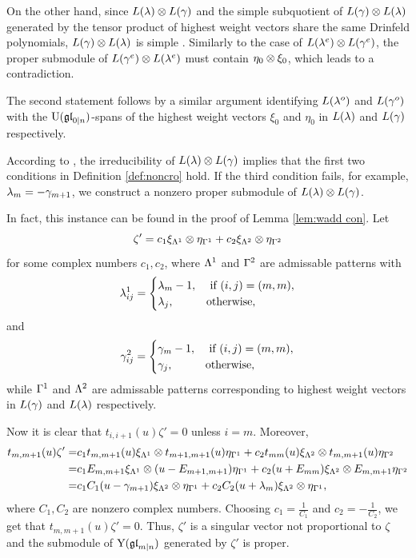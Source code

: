 \documentclass[12pt]{amsart}
\begin{document}
On the other hand, since $L(\lambda)\otimes L(\gamma)$ and the simple subquotient of $L(\gamma)\otimes L(\lambda)$ generated by the tensor product of highest weight vectors share the same Drinfeld polynomials, $L(\gamma)\otimes L(\lambda)$ is simple \cite{Zhang 1996}. Similarly to the case of $L(\lambda^e)\otimes L(\gamma^e)$, the proper submodule of $L(\gamma^e)\otimes L(\lambda^e)$ must contain $\eta_0\otimes \xi_0$, which leads to a contradiction.

The second statement follows by a similar argument identifying $L(\lambda^o)$ and $L(\gamma^o)$ with the ${\rm U}(\mathfrak{gl}_{0|n})$-spans of the highest weight vectors $\xi_0$ and $\eta_0$ in $L(\lambda)$  and $L(\gamma)$ respectively.
\epf

According to \cite{Mol 2002}, the irreducibility of $L(\lambda)\otimes L(\gamma)$ implies that  the first two conditions in Definition \ref{def:noncro} hold.
If the third condition fails, for example, $\lambda_m=-\gamma_{m+1}$, we construct a nonzero proper submodule of $L(\lambda)\otimes L(\gamma)$.

In fact, this instance can be found in the proof of Lemma \ref{lem:wadd con}.
Let  $$\zeta'=c_1\xi_{\Lambda^1}\otimes \eta_{\Gamma^1}+c_2\xi_{\Lambda^2}\otimes \eta_{\Gamma^2}$$ for some complex numbers $c_1,c_2$, where $\Lambda^1$ and $\Gamma^2$ are admissable patterns with
\[
\lambda^1_{ij}=\begin{cases}
\lambda_m-1,&\text{ if } (i,j)=(m,m),\\
\lambda_j,&\text{otherwise},
\end{cases}
\]
and
\[
\gamma^2_{ij}=\begin{cases}
\gamma_m-1,&\text{ if } (i,j)=(m,m),\\
\gamma_j,&\text{otherwise},
\end{cases}
\]
while $\Gamma^1$ and $\Lambda^2$ are admissable patterns corresponding to highest weight vectors in $L(\gamma)$ and $L(\lambda)$ respectively.

Now it is clear that $t_{i,i+1}(u)\zeta'=0$ unless $i=m$.
Moreover,
\[
\begin{split}
t_{m,m+1}(u)\zeta'=&c_1t_{m,m+1}(u)\xi_{\Lambda^1}\otimes t_{m+1,m+1}(u)\eta_{\Gamma^1}+c_2t_{mm}(u)\xi_{\Lambda^2}\otimes t_{m,m+1}(u)\eta_{\Gamma^2}\\
=&c_1E_{m,m+1}\xi_{\Lambda^1}\otimes (u-E_{m+1,m+1})\eta_{\Gamma^1}+c_2(u+E_{mm})\xi_{\Lambda^2}\otimes E_{m,m+1}\eta_{\Gamma^2}\\
=&c_1C_1(u-\gamma_{m+1})\xi_{\Lambda^2}\otimes \eta_{\Gamma^1}+c_2C_2(u+\lambda_m)\xi_{\Lambda^2}\otimes \eta_{\Gamma^1},
\end{split}
\]
where $C_1,C_2$ are nonzero complex numbers.
Choosing $c_1=\frac{1}{C_1}$ and $c_2=-\frac{1}{C_2}$,
 we get that $t_{m,m+1}(u)\zeta'=0$. Thus, $\zeta'$ is a singular vector not proportional to $\zeta$ and the submodule of ${\rm Y}(\mathfrak{gl}_{m|n})$ generated by $\zeta'$ is proper.
\end{document}
